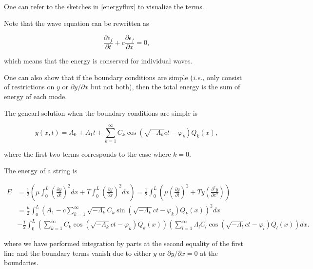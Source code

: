 \documentclass[a4paper,12pt]{report}
\begin{document}
One can refer to the sketches in \cref{energyflux} to visualize the terms.


Note that the wave equation can be rewritten as 

\begin{equation}
	\frac{\partial \epsilon _{f} }{\partial t} + c \frac{\partial \epsilon _{f} }{\partial x} = 0,  
\end{equation}

which means that the energy is conserved for individual waves.

One can also show that if the boundary conditions are simple (\textit{i.e.,} only consist of restrictions on \(y \text { or } \partial y /\partial x \) but not both), then the total energy is the sum of energy of each mode.

The genearl solution when the boundary conditions are simple is 

\begin{equation}
	y(x,t) = A_0 + A_1 t + \sum_{k=1}^{\infty} C_{k} \cos \left( \sqrt{- \Lambda _{k} }ct-\varphi _{k}   \right)Q_{k}(x),    
\end{equation}

where the first two terms corresponds to the case where \(k=0\). 

The energy of a string is 

\begin{equation}
	\begin{aligned} 
	E &= \frac{1}{2} \left( \mu \int_{0}^{L} \left( \frac{\partial y}{\partial t}  \right)^2dx + T \int_{0}^{L} \left( \frac{\partial y}{\partial x}  \right)^2 dx   \right) = \frac{1}{2} \int_{0}^{L} \left( \mu \left( \frac{\partial y}{\partial t}  \right)^2 + T y\left( \frac{\partial^2 y}{\partial x^2}  \right)\right)\\
      &=\frac{\mu }{2} \int_{0}^{L}  \left( A_1  - c \sum_{k=1}^{\infty} \sqrt{-\Lambda_k} C_k \sin\left(\sqrt{-\Lambda_k} c t - \varphi_k \right) Q_k(x) \right)^2dx \\
	  &- \frac{T}{2} \int_{0}^{L}  \left( \sum_{k=1}^{\infty} C_k \cos\left(\sqrt{-\Lambda_k} c t - \varphi_k \right) Q_k(x) \right) \left( \sum_{l=1}^{\infty} \Lambda_l C_l \cos\left(\sqrt{-\Lambda_l} c t - \varphi_l \right) Q_l(x) \right)  dx.
	  \end{aligned} 
\end{equation}

where we have performed integration by parts at the second equality of the first line and the boundary terms vanish due to either \(y \text { or }  \partial y / \partial x = 0\) at the boundaries. 
\end{document}
